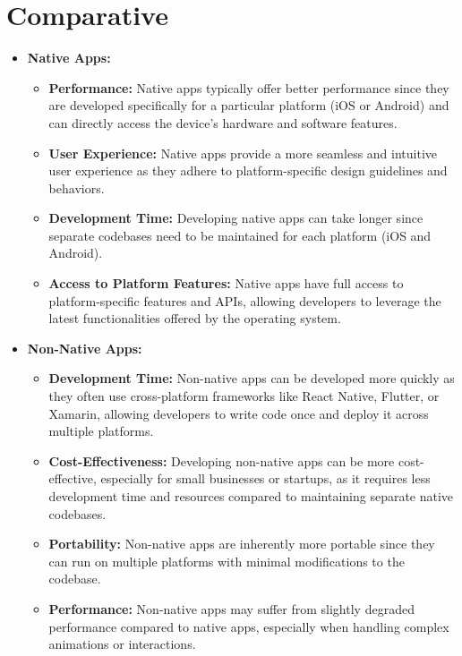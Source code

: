 \documentclass{article}
\begin{document}
\section{Comparative}
\begin{itemize}
    \item \textbf{Native Apps:}
    \begin{itemize}
        \item \textbf{Performance:} Native apps typically offer better performance since they are developed specifically for a particular platform (iOS or Android) and can directly access the device's hardware and software features.
        \item \textbf{User Experience:} Native apps provide a more seamless and intuitive user experience as they adhere to platform-specific design guidelines and behaviors.
        \item \textbf{Development Time:} Developing native apps can take longer since separate codebases need to be maintained for each platform (iOS and Android).
        \item \textbf{Access to Platform Features:} Native apps have full access to platform-specific features and APIs, allowing developers to leverage the latest functionalities offered by the operating system.
    \end{itemize}
    
    \item \textbf{Non-Native Apps:}
    \begin{itemize}
        \item \textbf{Development Time:} Non-native apps can be developed more quickly as they often use cross-platform frameworks like React Native, Flutter, or Xamarin, allowing developers to write code once and deploy it across multiple platforms.
        \item \textbf{Cost-Effectiveness:} Developing non-native apps can be more cost-effective, especially for small businesses or startups, as it requires less development time and resources compared to maintaining separate native codebases.
        \item \textbf{Portability:} Non-native apps are inherently more portable since they can run on multiple platforms with minimal modifications to the codebase.
        \item \textbf{Performance:} Non-native apps may suffer from slightly degraded performance compared to native apps, especially when handling complex animations or interactions.
    \end{itemize}
\end{itemize}
\end{document}
